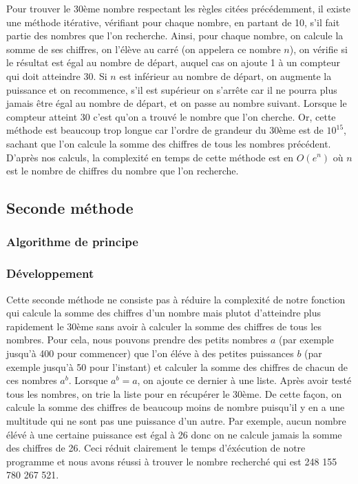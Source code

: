\documentclass{article}
\begin{document}
Pour trouver le 30ème nombre respectant les règles citées précédemment, il existe une méthode itérative, vérifiant pour chaque nombre, en partant de 10, s'il fait partie des nombres que l'on recherche. Ainsi, pour chaque nombre, on calcule la somme de ses chiffres, on l'élève au carré (on appelera ce nombre $n$), on vérifie si le résultat est égal au nombre de départ, auquel cas on ajoute 1 à un compteur qui doit atteindre 30. Si $n$ est inférieur au nombre de départ, on augmente la puissance et on recommence, s'il est supérieur on s'arrête car il ne pourra plus jamais être égal au nombre de départ, et on passe au nombre suivant. Lorsque le compteur atteint 30 c'est qu'on a trouvé le nombre que l'on cherche. Or, cette méthode est beaucoup trop longue car l'ordre de grandeur du 30ème est de $10^{15}$, sachant que l'on calcule la somme des chiffres de tous les nombres précédent. D'après nos calculs, la complexité en temps de cette méthode est en $O(e^{n})$  où $n$ est le nombre de chiffres du nombre que l'on recherche.


\subsection{Seconde méthode}

\subsubsection{Algorithme de principe}

\subsubsection{Développement}
Cette seconde méthode ne consiste pas à réduire la complexité de notre fonction qui calcule la somme des chiffres d'un nombre mais plutot d'atteindre plus rapidement le 30ème sans avoir à calculer la somme des chiffres de tous les nombres. Pour cela, nous pouvons prendre des petits nombres $a$ (par exemple jusqu'à 400 pour commencer) que l'on éléve à des petites puissances $b$ (par exemple jusqu'à 50 pour l'instant) et calculer la somme des chiffres de chacun de ces nombres $a^{b}$. Lorsque $a^{b} = a$, on ajoute ce dernier à une liste. Après avoir testé tous les nombres, on trie la liste pour en récupérer le 30ème. De cette façon, on calcule la somme des chiffres de beaucoup moins de nombre puisqu'il y en a une multitude qui ne sont pas une puissance d'un autre. Par exemple, aucun nombre élévé à une certaine puissance est égal à 26 donc on ne calcule jamais la somme des chiffres de 26. Ceci réduit clairement le temps d'éxécution de notre programme et nous avons réussi à trouver le nombre recherché qui est 248 155 780 267 521.
\end{document}
